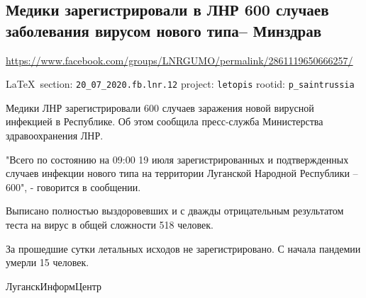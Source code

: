  
 

\subsection{Медики зарегистрировали в ЛНР 600 случаев заболевания вирусом нового типа– Минздрав}
\label{sec:20_07_2020.fb.lnr.12}
\url{https://www.facebook.com/groups/LNRGUMO/permalink/2861119650666257/}
  
\vspace{0.5cm}
{\small\LaTeX~section: \verb|20_07_2020.fb.lnr.12| project: \verb|letopis| rootid: \verb|p_saintrussia|}
\vspace{0.5cm}

Медики ЛНР зарегистрировали 600 случаев заражения новой вирусной инфекцией в
Республике. Об этом сообщила пресс-служба Министерства здравоохранения ЛНР.

"Всего по состоянию на 09:00 19 июля зарегистрированных и подтвержденных
случаев инфекции нового типа на территории Луганской Народной Республики –
600", - говорится в сообщении.

Выписано полностью выздоровевших и с дважды отрицательным результатом теста на
вирус в общей сложности 518 человек.

За прошедшие сутки летальных исходов не зарегистрировано. С начала пандемии
умерли 15 человек.

ЛуганскИнформЦентр 
